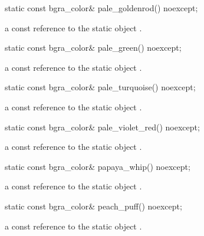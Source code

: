 \begin{itemdecl}
static const bgra_color& pale_goldenrod() noexcept;
\end{itemdecl}
\begin{itemdescr}
\pnum
\returns
a const reference to the static  object .
\end{itemdescr}

\begin{itemdecl}
static const bgra_color& pale_green() noexcept;
\end{itemdecl}
\begin{itemdescr}
\pnum
\returns
a const reference to the static  object .
\end{itemdescr}

\begin{itemdecl}
static const bgra_color& pale_turquoise() noexcept;
\end{itemdecl}
\begin{itemdescr}
\pnum
\returns
a const reference to the static  object .
\end{itemdescr}

\begin{itemdecl}
static const bgra_color& pale_violet_red() noexcept;
\end{itemdecl}
\begin{itemdescr}
\pnum
\returns
a const reference to the static  object .
\end{itemdescr}

\begin{itemdecl}
static const bgra_color& papaya_whip() noexcept;
\end{itemdecl}
\begin{itemdescr}
\pnum
\returns
a const reference to the static  object .
\end{itemdescr}

\begin{itemdecl}
static const bgra_color& peach_puff() noexcept;
\end{itemdecl}
\begin{itemdescr}
\pnum
\returns
a const reference to the static  object .
\end{itemdescr}

